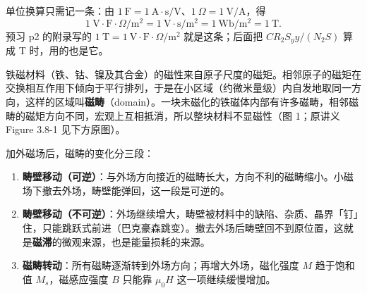 \documentclass[11pt]{ctexart}
\begin{document}
单位换算只需记一条：由 \(1\ \mathrm{F}=1\ \mathrm{A\cdot s/V}\)、\(1\ \Omega=1\ \mathrm{V/A}\)，得
\[
1\ \mathrm{V}\cdot\mathrm{F}\cdot\Omega/\mathrm{m^2}
=1\ \mathrm{V\cdot s/m^2}
=1\ \mathrm{Wb/m^2}
=1\ \mathrm{T}.
\]
预习 p2 的附录写的 \(1\ \mathrm{T}=1\ \mathrm{V}\cdot\mathrm{F}\cdot\Omega/\mathrm{m^2}\) 就是这条；后面把 \(C R_2S_y y/(N_2S)\) 算成 T 时，用的也是它。





铁磁材料（铁、钴、镍及其合金）的磁性来自原子尺度的磁矩。相邻原子的磁矩在交换相互作用下倾向于平行排列，于是在小区域（约微米量级）内自发地取同一方向，这样的区域叫\textbf{磁畴}（domain）。一块未磁化的铁磁体内部有许多磁畴，相邻磁畴的磁矩方向不同，宏观上互相抵消，所以整块材料不显磁性（图 1；原讲义 Figure 3.8-1 见下方原图）。

加外磁场后，磁畴的变化分三段：

\begin{enumerate}
\item \textbf{畴壁移动（可逆）}：与外场方向接近的磁畴长大，方向不利的磁畴缩小。小磁场下撤去外场，畴壁能弹回，这一段是可逆的。
\item \textbf{畴壁移动（不可逆）}：外场继续增大，畴壁被材料中的缺陷、杂质、晶界「钉」住，只能跳跃式前进（巴克豪森跳变）。撤去外场后畴壁回不到原位置，这就是\textbf{磁滞}的微观来源，也是能量损耗的来源。
\item \textbf{磁畴转动}：所有磁畴逐渐转到外场方向；再增大外场，磁化强度 \(M\) 趋于饱和值 \(M_s\)，磁感应强度 \(B\) 只能靠 \(\mu_0H\) 这一项继续缓慢增加。
\end{enumerate}
\end{document}
